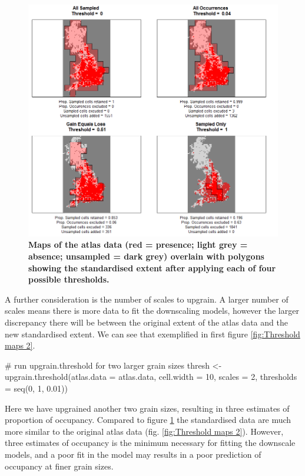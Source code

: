 \documentclass{article}[12pt, a4paper]
\begin{document}
\begin{figure}[!ht]
\centering
\includegraphics[width=\linewidth]{Threshold_maps.png}
\caption{\textbf{Maps of the atlas data (red = presence; light grey = absence; unsampled = dark grey) overlain with polygons showing the standardised extent after applying each of four possible thresholds.}}
\label{fig:Threshold maps}
\end{figure}

A further consideration is the number of scales to upgrain. A larger number of scales means there is more data to fit the downscaling models, however the larger discrepancy there will be between the original extent of the atlas data and the new standardised extent. We can see that exemplified in first figure \ref{fig:Threshold maps 2}. 

\begin{Schunk}
\begin{Sinput}
# run upgrain.threshold for two larger grain sizes
thresh <- upgrain.threshold(atlas.data = atlas.data,
                            cell.width = 10,
                            scales = 2,
                            thresholds = seq(0, 1, 0.01))
\end{Sinput}
\end{Schunk}

Here we have upgrained another two grain sizes, resulting in three estimates of proportion of occupancy. Compared to figure \ref{fig:Threshold maps} the standardised data are much more similar to the original atlas data (fig. \ref{fig:Threshold maps 2}). However, three estimates of occupancy is the minimum necessary for fitting the downscale models, and a poor fit in the model may results in a poor prediction of occupancy at finer grain sizes.
\end{document}
